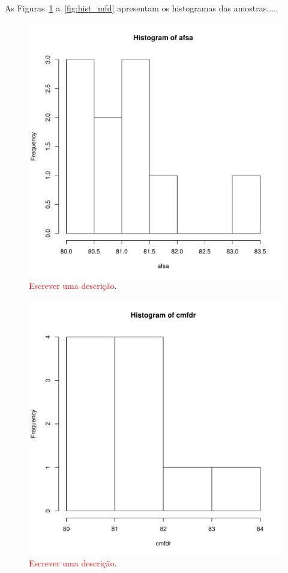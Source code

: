 \documentclass[conference]{IEEEtran}
\begin{document}
As Figuras~\ref{fig:hist_afsa} a~\ref{fig:hist_mfd} apresentam os histogramas das amostras.....

\begin{figure}[h]
	\centering
	\includegraphics[width=\linewidth]{img/hist_afsa.pdf}
	\caption{\textcolor{red}{Escrever uma descrição}.}
	\label{fig:hist_afsa}
\end{figure}

\begin{figure}[h]
	\centering
	\includegraphics[width=\linewidth]{img/hist_cmfdr.pdf}
	\caption{\textcolor{red}{Escrever uma descrição}.}
	\label{fig:hist_cmfdr}
\end{figure}
\end{document}
